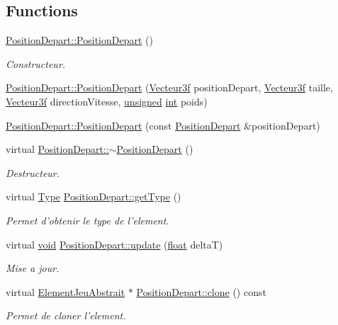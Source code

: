 \subsection*{Functions}
\begin{DoxyCompactItemize}
\item 
\hyperlink{group___i_n_f2990-04_ga2cd5d23fdefd5a5db303a8c7e2af9c3c}{Position\-Depart\-::\-Position\-Depart} ()
\begin{DoxyCompactList}\small\item\em Constructeur. \end{DoxyCompactList}\item 
\hyperlink{group___i_n_f2990-04_ga48b038debe01d96507a78be1940891f8}{Position\-Depart\-::\-Position\-Depart} (\hyperlink{group__utilitaire_ga6b2956069f76c7e27df4f79f87e5a48c}{Vecteur3f} position\-Depart, \hyperlink{group__utilitaire_ga6b2956069f76c7e27df4f79f87e5a48c}{Vecteur3f} taille, \hyperlink{group__utilitaire_ga6b2956069f76c7e27df4f79f87e5a48c}{Vecteur3f} direction\-Vitesse, \hyperlink{_free_image_8h_a425076c7067a1b5166e2cc530e914814}{unsigned} \hyperlink{wglew_8h_a500a82aecba06f4550f6849b8099ca21}{int} poids)
\item 
\hyperlink{group___i_n_f2990-04_ga407a4f493c341f2b9ce6f05d575676aa}{Position\-Depart\-::\-Position\-Depart} (const \hyperlink{class_position_depart}{Position\-Depart} \&position\-Depart)
\item 
virtual \hyperlink{group___i_n_f2990-04_ga7223f64532a213cd4faf6e29aa5c5a30}{Position\-Depart\-::$\sim$\-Position\-Depart} ()
\begin{DoxyCompactList}\small\item\em Destructeur. \end{DoxyCompactList}\item 
virtual \hyperlink{group___i_n_f2990-04_ga1d1cfd8ffb84e947f82999c682b666a7}{Type} \hyperlink{group___i_n_f2990-04_gae4b1d64b04abfd849ef302e41c6fc6d1}{Position\-Depart\-::get\-Type} ()
\begin{DoxyCompactList}\small\item\em Permet d'obtenir le type de l'element. \end{DoxyCompactList}\item 
virtual \hyperlink{wglew_8h_aeea6e3dfae3acf232096f57d2d57f084}{void} \hyperlink{group___i_n_f2990-04_gac089935dcf561edb43c8a402e6f6ace5}{Position\-Depart\-::update} (\hyperlink{fmod_8h_aeb841aa4b4b5f444b5d739d865b420af}{float} delta\-T)
\begin{DoxyCompactList}\small\item\em Mise a jour. \end{DoxyCompactList}\item 
virtual \hyperlink{class_element_jeu_abstrait}{Element\-Jeu\-Abstrait} $\ast$ \hyperlink{group___i_n_f2990-04_ga8d1a454a58e20a9dda3d393d2ed02271}{Position\-Depart\-::clone} () const 
\begin{DoxyCompactList}\small\item\em Permet de cloner l'element. \end{DoxyCompactList}\end{DoxyCompactItemize}


